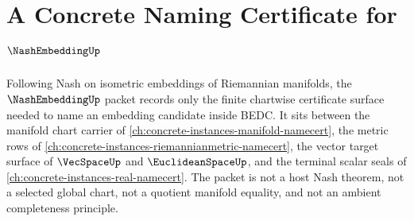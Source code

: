 \chapter{A Concrete Naming Certificate for $\NashEmbeddingUp$}
\label{ch:concrete-instances-nash-embedding-namecert}

Following Nash on isometric embeddings of Riemannian manifolds, the $\NashEmbeddingUp$ packet records only the finite chartwise certificate surface needed to name an embedding candidate inside BEDC. It sits between the manifold chart carrier of \autoref{ch:concrete-instances-manifold-namecert}, the metric rows of \autoref{ch:concrete-instances-riemannianmetric-namecert}, the vector target surface of $\VecSpaceUp$ and $\EuclideanSpaceUp$, and the terminal scalar seals of \autoref{ch:concrete-instances-real-namecert}. The packet is not a host Nash theorem, not a selected global chart, not a quotient manifold equality, and not an ambient completeness principle.


